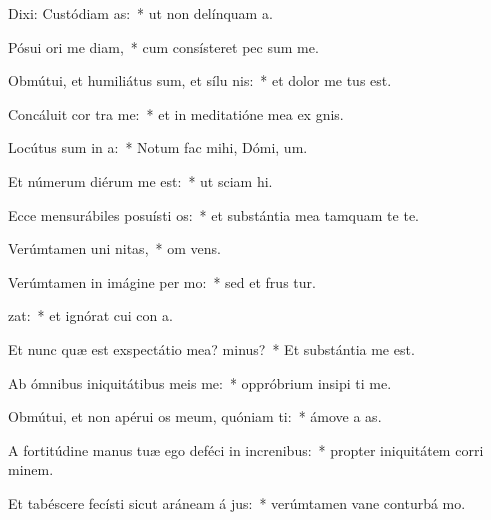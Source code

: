 \item Dixi: Custódiam  as:~* ut non delínquam   a.
\item Pósui ori me diam,~* cum consísteret pec sum me.
\item Obmútui, et humiliátus sum, et sílu  nis:~* et dolor me tus est.
\item Concáluit cor  tra me:~* et in meditatióne mea ex gnis.
\item Locútus sum in  a:~* Notum fac mihi, Dómi,  um.
\item Et númerum diérum me  est:~* ut sciam   hi.
\item Ecce mensurábiles posuísti  os:~* et substántia mea tamquam  te te.
\item Verúmtamen uni nitas,~* om  vens.
\item Verúmtamen in imágine per mo:~* sed et frus tur.
\item {}zat:~* et ignórat cui con a.
\item Et nunc quæ est exspectátio mea?  minus?~* Et substántia me   est.
\item Ab ómnibus iniquitátibus meis  me:~* oppróbrium insipi ti me.
\item Obmútui, et non apérui os meum, quóniam  ti:~* ámove a   as.
\item A fortitúdine manus tuæ ego deféci in increnibus:~* propter iniquitátem corri minem.
\item Et tabéscere fecísti sicut aráneam á jus:~* verúmtamen vane conturbá  mo.
